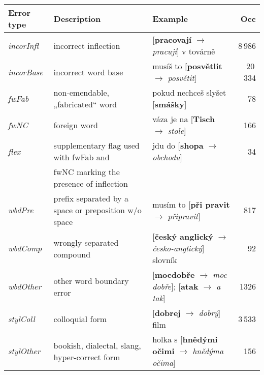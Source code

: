 \documentclass[11pt,a4paper]{article}
\begin{document}
\begin{table*}[ht!]
    \centering
    \small
    \setlength{\tabcolsep}{3.2pt}
    \begin{tabular}{l|l|l|r}
    Error type & Description & Example & Occ \\\hline
\emph{incorInfl} & incorrect inflection & [\textbf{pracovají} $\rightarrow$ \emph{pracují}] v továrně & 8\,986\\ \emph{incorBase} & incorrect word base & musíš to [\textbf{posvětlit} $\rightarrow$ \emph{posvětit}] & 20\,334 \\ \emph{fwFab} & non-emendable, „fabricated“ word & pokud nechceš slyšet [\textbf{smášky}] & 78 \\
\emph{fwNC} & foreign word & váza je na [\textbf{Tisch} $\rightarrow$ \emph{stole}] & 166 \\
\emph{flex} & supplementary flag used with fwFab and & jdu do [\textbf{shopa} $\rightarrow$ \emph{obchodu}] & 34 \\
      & fwNC marking the presence of inflection  & \\
\emph{wbdPre} & prefix separated by a space or preposition w/o space & musím to [\textbf{při pravit} $\rightarrow$ \emph{připravit}] & 817 \\
\emph{wbdComp} & wrongly separated compound & [\textbf{český anglický} $\rightarrow$ \emph{česko-anglický}] slovník & 92 \\
\emph{wbdOther} & other word boundary error  & [\textbf{mocdobře} $\rightarrow$ \emph{moc dobře}]; [\textbf{atak} $\rightarrow$ \emph{a tak}] & 1326 \\
\emph{stylColl} & colloquial form & [\textbf{dobrej} $\rightarrow$ \emph{dobrý}] film & 3\,533 \\
\emph{stylOther} & bookish, dialectal, slang, hyper-correct form & holka s [\textbf{hnědými očimi} $\rightarrow$ \emph{hnědýma očima}] & 156 \\
\hline


\end{tabular}
\end{table*}
\end{document}
